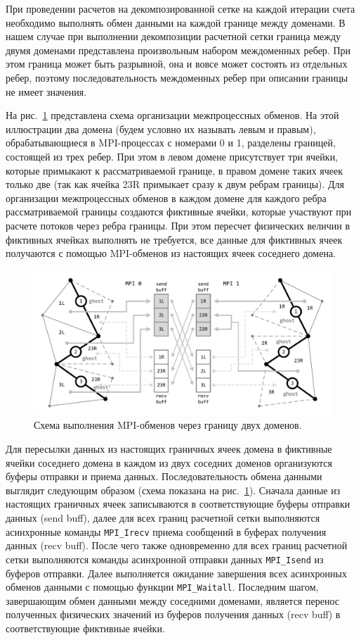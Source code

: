 При проведении расчетов на декомпозированной сетке на каждой итерации счета необходимо выполнять обмен данными на каждой границе между доменами.
В нашем случае при выполнении декомпозиции расчетной сетки граница между двумя доменами представлена произвольным набором междоменных ребер.
При этом граница может быть разрывной, она и вовсе может состоять из отдельных ребер, поэтому последовательность междоменных ребер при описании границы не имеет значения.

На рис.~\ref{fig:text_2_scaling_mpi} представлена схема организации межпроцессных обменов.
На этой иллюстрации два домена (будем условно их называть левым и правым), обрабатывающиеся в MPI-процессах с номерами 0 и 1, разделены границей, состоящей из трех ребер.
При этом в левом домене присутствует три ячейки, которые примыкают к рассматриваемой границе, в правом домене таких ячеек только две (так как ячейка 23R примыкает сразу к двум ребрам границы).
Для организации межпроцессных обменов в каждом домене для каждого ребра рассматриваемой границы создаются фиктивные ячейки, которые участвуют при расчете потоков через ребра границы.
При этом пересчет физических величин в фиктивных ячейках выполнять не требуется, все данные для фиктивных ячеек получаются с помощью MPI-обменов из настоящих ячеек соседнего домена.

\begin{figure}[ht]
\centering
\includegraphics[width=1.0\textwidth]{fig/par_surf_mpi.pdf}
\singlespacing
{}\caption{Схема выполнения MPI-обменов через границу двух доменов.}\label{fig:text_2_scaling_mpi}
\end{figure}

Для пересылки данных из настоящих граничных ячеек домена в фиктивные ячейки соседнего домена в каждом из двух соседних доменов организуются буферы отправки и приема данных.
Последовательность обмена данными выглядит следующим образом (схема показана на рис.~\ref{fig:text_2_scaling_mpi}).
Сначала данные из настоящих граничных ячеек записываются в соответствующие буферы отправки данных (send buff), далее для всех границ расчетной сетки выполняются асинхронные команды \texttt{MPI\_Irecv} приема сообщений в буферах получения данных (recv buff).
После чего также одновременно для всех границ расчетной сетки выполняются команды асинхронной отправки данных \texttt{MPI\_Isend} из буферов отправки.
Далее выполняется ожидание завершения всех асинхронных обменов данными с помощью функции \texttt{MPI\_Waitall}.
Последним шагом, завершающим обмен данными между соседними доменами, является перенос полученных физических значений из буферов получения данных (recv buff) в соответствующие фиктивные ячейки.

